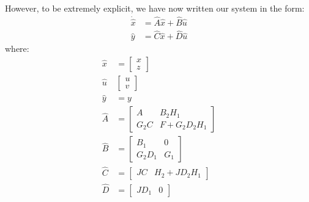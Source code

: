 \documentclass[12pt]{exam}
\begin{document}
\begin{questions}
\begin{solution}
    However, to be extremely explicit, we have now written our system in the form:
    \begin{align*}
      \dot{\hat{x}} &= \hat{A}\hat{x} + \hat{B}\hat{u} \\
      \hat{y} &= \hat{C}\hat{x} + \hat{D}\hat{u}
    \end{align*}
    where:
    \begin{align*}
      \hat{x} &= \begin{bmatrix} x \\ z \end{bmatrix} \\
      \hat{u} & \begin{bmatrix} u \\ v \end{bmatrix}  \\
      \hat{y} &= y \\
      \hat{A} &= 
        \begin{bmatrix}
          A & B_2H_1 \\
          G_2C & F + G_2D_2H_1
        \end{bmatrix} \\
      \hat{B} &=
        \begin{bmatrix}
          B_1 & 0 \\
          G_2D_1 & G_1 
        \end{bmatrix} \\
      \hat{C} &= 
        \begin{bmatrix}
          JC & H_2 + JD_2H_1
        \end{bmatrix}\\
      \hat{D} &= 
        \begin{bmatrix}
          JD_1 & 0
        \end{bmatrix}
    \end{align*}
  \end{solution}


\end{questions}
\end{document}
